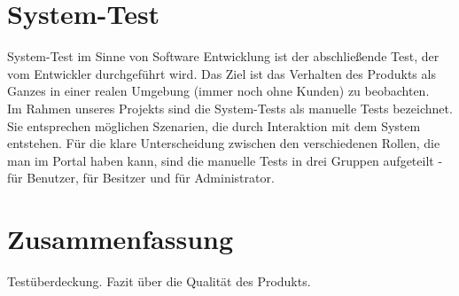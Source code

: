 \documentclass[parskip=full,11pt]{scrartcl}
\begin{document}
\section{System-Test}
System-Test im Sinne von Software Entwicklung ist der abschließende Test, der vom Entwickler durchgeführt wird. Das Ziel ist das Verhalten des Produkts als Ganzes in einer realen Umgebung (immer noch ohne Kunden) zu beobachten.\\
Im Rahmen unseres Projekts sind die System-Tests als manuelle Tests bezeichnet. Sie entsprechen möglichen Szenarien, die durch Interaktion mit dem System entstehen. Für die klare Unterscheidung zwischen den verschiedenen Rollen, die man im Portal haben kann, sind die manuelle Tests in drei Gruppen aufgeteilt - für Benutzer, für Besitzer und für Administrator.

\newpage
\section{Zusammenfassung}
Testüberdeckung. Fazit über die Qualität des Produkts.
\end{document}
